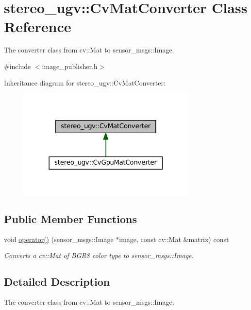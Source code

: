\hypertarget{classstereo__ugv_1_1CvMatConverter}{}\section{stereo\+\_\+ugv\+:\+:Cv\+Mat\+Converter Class Reference}
\label{classstereo__ugv_1_1CvMatConverter}


The converter class from cv\+::\+Mat to sensor\+\_\+msgs\+::\+Image.  




{\ttfamily \#include $<$image\+\_\+publisher.\+h$>$}



Inheritance diagram for stereo\+\_\+ugv\+:\+:Cv\+Mat\+Converter\+:\nopagebreak
\begin{figure}[H]
\begin{center}
\leavevmode
\includegraphics[width=255pt]{classstereo__ugv_1_1CvMatConverter__inherit__graph}
\end{center}
\end{figure}
\subsection*{Public Member Functions}
\begin{DoxyCompactItemize}
\item 
void \hyperlink{classstereo__ugv_1_1CvMatConverter_ad637bfe9ffdf0a07332e516d1aeafe29}{operator()} (sensor\+\_\+msgs\+::\+Image $\ast$image, const cv\+::\+Mat \&matrix) const
\begin{DoxyCompactList}\small\item\em Converts a cv\+::\+Mat of B\+G\+R8 color type to sensor\+\_\+msgs\+::\+Image. \end{DoxyCompactList}\end{DoxyCompactItemize}


\subsection{Detailed Description}
The converter class from cv\+::\+Mat to sensor\+\_\+msgs\+::\+Image. 

